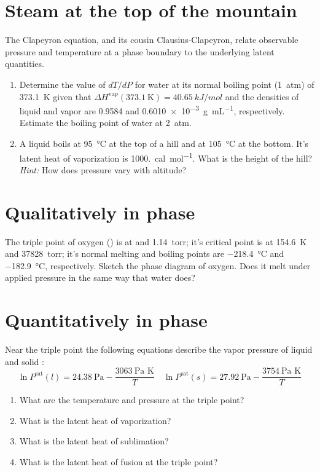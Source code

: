 \documentclass[11pt]{article}
\begin{document}
\section{Steam at the top of the mountain}
\label{sec:orgdc49e0d}
The Clapeyron equation, and its cousin Clausius-Clapeyron, relate observable
  pressure and temperature at a phase boundary to the underlying latent
  quantities.
\begin{enumerate}
\item Determine the value of \(dT/dP\) for water at its normal boiling point (\SI{1}{atm})
of \SI{373.1}{K} given that \(\Delta
   H^\text{vap}(373.1~\text{K})=\SI{40.65}{kJ/mol}\) and the densities of liquid
and vapor are 0.9584 and \SI{0.6010e-3}{\gram\per\milli\liter}, respectively.
Estimate the boiling point of water at \SI{2}{atm}.

\item A liquid boils at \SI{95}{\celsius} at the top of a hill and at \SI{105}{\celsius} at the
bottom.  It's latent heat of vaporization is \SI{1000.}{cal\per\mole}.  What is the height
of the hill?  \emph{Hint:} How does pressure vary with altitude?
\end{enumerate}

\section{Qualitatively in phase}
\label{sec:orgbd8732c}
The triple point of oxygen () is at  and \SI{1.14}{torr}; it's
  critical point is at \SI{154.6}{K} and \SI{37828}{torr}; it's normal melting and boiling
  points are \SI{-218.4}{\celsius} and \SI{-182.9}{\celsius}, respectively.
  Sketch the phase diagram of oxygen.  Does it melt under applied pressure in
  the same way that water does?

\section{Quantitatively in phase}
\label{sec:orgaeca7c9}
Near the triple point the following equations describe the vapor pressure of
    liquid and solid :
\begin{equation*}
  \ln P^\text{sat}(l) = 24.38~\text{Pa} - \frac{3063~\text{Pa K}}{T} \quad  \ln P^\text{sat}(s) = 27.92~\text{Pa} - \frac{3754~\text{Pa K}}{T}
\end{equation*}

\begin{enumerate}
\item What are the temperature and pressure at the triple point?
\item What is the latent heat of vaporization?
\item What is the latent heat of sublimation?
\item What is the latent heat of fusion at the triple point?
\end{enumerate}
\end{document}
